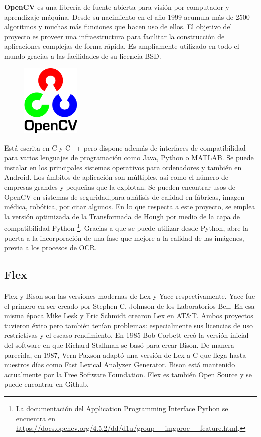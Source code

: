 \textbf{OpenCV} \cite{opencvTeam_oficialSite_main} es una librería de fuente abierta para visión por computador y aprendizaje máquina. Desde su nacimiento en el año 1999 acumula más de 2500 algoritmos y muchas más funciones que hacen uso de ellos. El objetivo del proyecto es proveer una infraestructura para facilitar la construcción de aplicaciones complejas de forma rápida. Es ampliamente utilizado en todo el mundo gracias a las facilidades de su licencia BSD. 

\begin{figure}
    \centering
    \includegraphics[width=0.25\textwidth]{imaxes/e-fundamentos-tecnologicos/logo-opencv.png}
\end{figure}

Está escrita en C y C++ pero dispone además de interfaces de compatibilidad para varios lenguajes de programación como Java, Python o MATLAB. Se puede instalar en los principales sistemas operativos para ordenadores y también en Android. Los ámbitos de aplicación son múltiples, así como el número de empresas grandes y pequeñas que la explotan. Se pueden encontrar usos de OpenCV en sistemas de seguridad,para análisis de calidad en fábricas, imagen médica, robótica, por citar algunos. En lo que respecta a este proyecto, se emplea la versión optimizada de la Transformada de Hough por medio de la capa de compatibilidad Python \footnote{La documentación del Application Programming Interface Python se encuentra en \url{https://docs.opencv.org/4.5.2/dd/d1a/group__imgproc__feature.html}.}. Gracias a que se puede utilizar desde Python, abre la puerta a la incorporación de una fase que mejore a la calidad de las imágenes, previa a los procesos de OCR.

\subsection{Flex}
\label{subsec:flex}

Flex y Bison son las versiones modernas de Lex y Yacc respectivamente. Yacc fue el primero en ser creado por Stephen C. Johnson de los Laboratorios Bell. En esa misma época Mike Lesk y Eric Schmidt crearon Lex en AT\&T. Ambos proyectos tuvieron éxito pero también tenían problemas: especialmente sus licencias de uso restrictivas y el escaso rendimiento.
En 1985 Bob Corbett creó la versión inicial del software en que Richard Stallman se basó para crear Bison. De manera parecida, en 1987, Vern Paxson adaptó una versión de Lex a C que llega hasta nuestros días como Fast Lexical Analyzer Generator. Bison está mantenido actualmente por la Free Software Foundation. Flex es también Open Source y se puede encontrar en Github.

